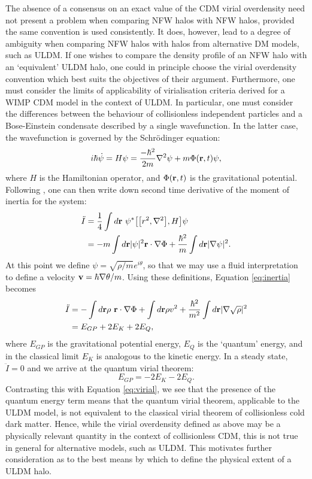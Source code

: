 \documentclass[a4paper,11pt]{article}
\begin{document}
The absence of a consensus on an exact value of the CDM virial overdensity need not present a problem when comparing NFW halos with NFW halos, provided the same convention is used consistently. It does, however, lead to a degree of ambiguity when comparing NFW halos with halos from alternative DM models, such as ULDM. If one wishes to compare the density profile of an NFW halo with an `equivalent' ULDM halo, one could in principle choose the virial overdensity convention which best suits the objectives of their argument. Furthermore, one must consider the limits of applicability of virialisation criteria derived for a WIMP CDM model in the context of ULDM. In particular, one must consider the differences between the behaviour of collisionless independent particles and a Bose-Einstein condensate described by a single wavefunction. In the latter case, the wavefunction is governed by the Schr{\"o}dinger equation:
\begin{equation}\label{eq:schrodinger}
    i\hbar\dot{\psi} = H\psi = \frac{-\hbar^2}{2m}\nabla^2\psi+m\Phi(\bold{r},t)\psi,
\end{equation}
where $H$ is the Hamiltonian operator, and $\Phi(\bold{r},t)$ is the gravitational potential. Following \cite{Witten review}, one can then write down second time derivative of the moment of inertia for the system:
\begin{align}\label{eq:inertia}
    \ddot{I} &= \frac{1}{4}\int d\bold{r} \ \psi^*\big[\big[r^2,\nabla^2\big], H\big]\psi\nonumber\\
    &= -m \int d\bold{r}\vert\psi\vert^2\bold{r}\cdot\bold{\nabla}\Phi+\frac{\hbar^2}{m}\int d\bold{r}\vert\bold{\nabla\psi}\vert^2.
\end{align}
At this point we define $\psi = \sqrt{\rho/m}e^{i\theta}$, so that we may use a fluid interpretation to define a velocity $\bold{v}=\hbar\bold{\nabla}\theta/m$. Using these definitions, Equation \ref{eq:inertia} becomes
\begin{align}
    \ddot{I}&=-\int d\bold{r}\rho \ \bold{r}\cdot\bold{\nabla}\Phi+\int d\bold{r}\rho v^2+\frac{\hbar^2}{m^2}\int d\bold{r}\vert\bold{\nabla}\sqrt{\rho}\vert^2\nonumber\\
    &= E_{GP}+2E_{K}+2E_{Q},
\end{align}
where $E_{GP}$ is the gravitational potential energy, $E_Q$ is the `quantum' energy, and in the classical limit $E_K$ is analogous to the kinetic energy. In a steady state, $\ddot{I}=0$ and we arrive at the quantum virial theorem:
\begin{equation}\label{eq:quantum_virial}
    E_{GP} = -2E_{K}-2E_{Q}.
\end{equation}
Contrasting this with Equation \ref{eq:virial}, we see that the presence of the quantum energy term means that the quantum virial theorem, applicable to the ULDM model, is not equivalent to the classical virial theorem of collisionless cold dark matter. Hence, while the virial overdensity defined as above may be a physically relevant quantity in the context of collisionless CDM, this is not true in general for alternative models, such as ULDM. This motivates further consideration as to the best means by which to define the physical extent of a ULDM halo. 
\end{document}
